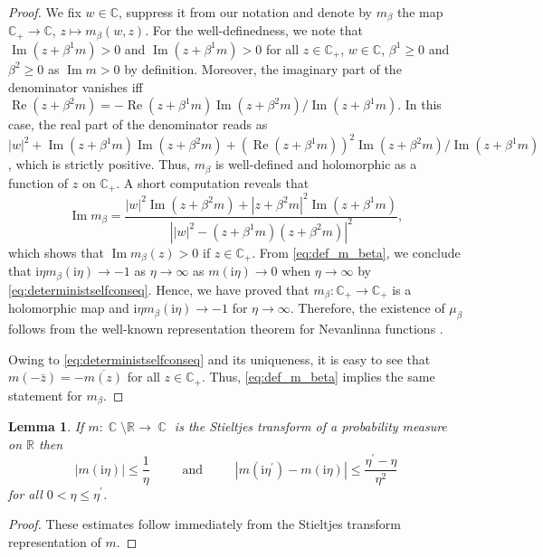 \documentclass[10pt,a4paper]{amsart}
\DeclareMathOperator{\Ima}{Im}
\DeclareMathOperator{\CC}{\mathbb{C}}
\newcommand{\ii}{\mathrm{i}}
\newcommand{\abs}[1]{\left| #1 \right|}
\newcommand{\R}{\mathbb{R}}
\newcommand{\C}{\mathbb{C}}
\DeclareMathOperator{\re}{Re}
\newcommand{\im}{\Ima}
\newtheorem{lemma}{Lemma}[section]
\numberwithin{equation}{section}
\newcommand*\barr[1]{\overline{#1}}
\begin{document}
	\begin{proof} 
		We fix $w \in \C$, suppress it from our notation and denote by $m_\beta$ the map $\C_+ \to \C$, $z \mapsto m_\beta(w,z)$.
		For the well-definedness, we note that $\im (z + \beta^1m ) >0$ and $\im (z + \beta^1m ) >0$ for all $z \in \C_+$, $w \in \C$, $\beta^1 \geq 0$ and $\beta^2 \geq 0$ as $\im m >0$ by definition. 
		Moreover, the imaginary part of the denominator vanishes iff $\re(z + \beta^2m) = - \re (z + \beta^1m)\im(z + \beta^2m)/\im (z + \beta^1 m)$. In this case, 
		the real part of the denominator reads as $\abs{w}^2 + \im(z + \beta^1 m) \im (z+ \beta^2m ) + (\re (z + \beta^1 m))^2 \im (z + \beta^2 m)/\im(z + \beta^1 m)$, which is strictly positive. 
		Thus, $m_\beta$ is well-defined and holomorphic as a function of $z$ on $\C_+$. 
		A short computation reveals that 
		\[ \im m_\beta= \frac{\abs{w}^2 \im(z + \beta^2 m) + \abs{z + \beta^2m}^2 \im (z + \beta^1 m)}{\abs{\abs{w}^2 - (z+ \beta^1m) (z + \beta^2m)}^2},  
		\]
		which shows that $\im m_\beta(z) >0$ if $z \in \C_+$. From \eqref{eq:def_m_beta}, we conclude that $\ii \eta m_\beta(\ii \eta) \to -1$ as $\eta \to \infty$ as $m(\ii \eta) \to 0$ when $\eta \to \infty$ by \eqref{eq:deterministselfconseq}. 
		Hence, we have proved that $m_\beta \colon \C_+ \to \C_+$ is a holomorphic map and 
		$\ii \eta m_\beta(\ii \eta) \to -1$ for $\eta \to \infty$. 
		Therefore, the existence of $\mu_\beta$ follows from the well-known representation theorem for Nevanlinna functions \cite[Theorem 11.9]{Rudin1987Analysis}.
		
		
		Owing to \eqref{eq:deterministselfconseq} and its uniqueness, it is easy to see that $m(-\bar z) = - \barr{m(z)}$ for all $z \in \C_+$. Thus, \eqref{eq:def_m_beta} implies the same statement for $m_\beta$.
	\end{proof} 
	
	\begin{lemma}\label{lem:Stieltjes_proper}
		If $m: \CC\setminus \R \rightarrow \CC$ is the Stieltjes transform of a probability measure on $\R$ then
		\begin{equation*}
			|m(\ii \eta)| \le \frac{1}{\eta }~ 
			\qquad \text{ and } \qquad ~| m(\ii \eta^\prime ) - m(\ii \eta) | \le \frac{\eta^{\prime} -\eta}{\eta^2}
		\end{equation*}
		for all $0 < \eta \le \eta^{\prime}$. 
	\end{lemma}
	
	\begin{proof} 
		These estimates follow immediately from the Stieltjes transform representation of $m$.
	\end{proof} 
	
\end{document}
